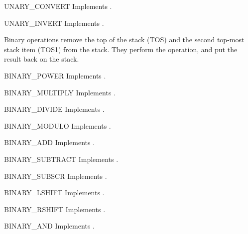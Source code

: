 \begin{opcodedesc}{UNARY_CONVERT}{}
Implements .
\end{opcodedesc}

\begin{opcodedesc}{UNARY_INVERT}{}
Implements .
\end{opcodedesc}

Binary operations remove the top of the stack (TOS) and the second top-most
stack item (TOS1) from the stack.  They perform the operation, and put the
result back on the stack.

\begin{opcodedesc}{BINARY_POWER}{}
Implements .
\end{opcodedesc}

\begin{opcodedesc}{BINARY_MULTIPLY}{}
Implements .
\end{opcodedesc}

\begin{opcodedesc}{BINARY_DIVIDE}{}
Implements .
\end{opcodedesc}

\begin{opcodedesc}{BINARY_MODULO}{}
Implements .
\end{opcodedesc}

\begin{opcodedesc}{BINARY_ADD}{}
Implements .
\end{opcodedesc}

\begin{opcodedesc}{BINARY_SUBTRACT}{}
Implements .
\end{opcodedesc}

\begin{opcodedesc}{BINARY_SUBSCR}{}
Implements .
\end{opcodedesc}

\begin{opcodedesc}{BINARY_LSHIFT}{}
Implements .
\end{opcodedesc}

\begin{opcodedesc}{BINARY_RSHIFT}{}
Implements .
\end{opcodedesc}

\begin{opcodedesc}{BINARY_AND}{}
Implements .
\end{opcodedesc}

